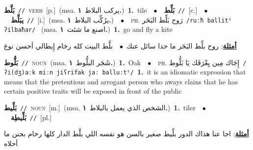 \documentclass[10pt,a4paper,twoside]{article} %
\begin{document}
\begin{multicols}{2}
{\setlength\topsep{0pt}\textbf{\foreignlanguage{arabic}{بَلَّط}}\ {\color{gray}\texttt{//}\color{black}}\ \textsc{verb}\ [p.]\ \color{gray}(msa. \foreignlanguage{arabic}{يركب البلاط}~\foreignlanguage{arabic}{\textbf{١.}})\color{black}\ \textbf{1.}~tile\ \ $\bullet$\ \ \setlength\topsep{0pt}\textbf{\foreignlanguage{arabic}{بَلِّط}}\ {\color{gray}\texttt{//}\color{black}}\ [c.]\ \ $\bullet$\ \ \setlength\topsep{0pt}\textbf{\foreignlanguage{arabic}{يبَلِّط}}\ {\color{gray}\texttt{//}\color{black}}\ [i.]\ \color{gray}(msa. \foreignlanguage{arabic}{يرُكِّب البلاط}~\foreignlanguage{arabic}{\textbf{١.}})\color{black}\ \ $\bullet$\ \ \textsc{ph.} \color{gray} \foreignlanguage{arabic}{رَوح بَلِّط البَحَر}\color{black}\ {\color{gray}\texttt{/{\sffamily ruːħ ballitˤ ʔilbaħar}/}\color{black}}\ \color{gray} (msa. \foreignlanguage{arabic}{اصنع ما شئت}~\foreignlanguage{arabic}{\textbf{١.}})\color{black}\ \textbf{1.}~go and fly a kite\  \begin{flushright}\color{gray}\foreignlanguage{arabic}{\textbf{\underline{\foreignlanguage{arabic}{أمثلة}}}: روح بلِّط البَحَر ما حدا سائل عنك\ $\bullet$\ \  بلَّط البيت كله رخام إِيطالي أحسن نوع}\end{flushright}\color{black}} \vspace{2mm}

{\setlength\topsep{0pt}\textbf{\foreignlanguage{arabic}{بَلُّوط}}\ {\color{gray}\texttt{//}\color{black}}\ \textsc{noun}\ \color{gray}(msa. \foreignlanguage{arabic}{شَجَر البلُّوط}~\foreignlanguage{arabic}{\textbf{١.}})\color{black}\ \textbf{1.}~Oak\ \ $\bullet$\ \ \textsc{ph.} \color{gray} \foreignlanguage{arabic}{إِجَاك مِين يِعْرَفَك يَا بَلُّوط}\color{black}\ {\color{gray}\texttt{/{\sffamily ʔi(dʒ)aːk miːn jiʕrifak jaː balluːtˤ}/}\color{black}}\ \textbf{1.}~it is an idiomatic expression that means that the pretentious and arrogant person who aways clains that he has certain positive traits will be exposed in front of the public\ } \vspace{2mm}

{\setlength\topsep{0pt}\textbf{\foreignlanguage{arabic}{بَلِّيط}}\ {\color{gray}\texttt{//}\color{black}}\ \textsc{noun}\ [m.]\ \color{gray}(msa. \foreignlanguage{arabic}{الشخص الذي يعمل بالبلاط}~\foreignlanguage{arabic}{\textbf{١.}})\color{black}\ \textbf{1.}~tiler\ \ $\bullet$\ \ \setlength\topsep{0pt}\textbf{\foreignlanguage{arabic}{بَلِّيطِة}}\ {\color{gray}\texttt{//}\color{black}}\ [pl.]\  \begin{flushright}\color{gray}\foreignlanguage{arabic}{\textbf{\underline{\foreignlanguage{arabic}{أمثلة}}}: اجا عنا هذاك الدور بلِّيط صغير بالسن هو نفسه اللي بلَّط الدار كلها رخام بجنن ما أحلاه}\end{flushright}\color{black}} \vspace{2mm}


\end{multicols}
\end{document}

